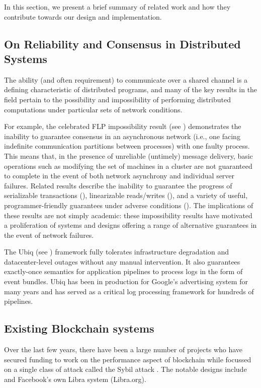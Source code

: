 \label{sec:related}
In this section, we present a brief summary of related work and how they contribute towards
our design and implementation.


\subsection{On Reliability and Consensus in Distributed Systems}

The ability (and often requirement) to communicate over a shared channel is a defining characteristic of distributed
programs, and many of the key results in the field pertain to the possibility and impossibility of performing
distributed computations under particular sets of network conditions.

For example, the celebrated FLP impossibility result (see \cite{fischer1985}) demonstrates the inability to guarantee consensus in an
asynchronous network (i.e., one facing indefinite communication partitions between processes) with one faulty process.
This means that, in the presence of unreliable (untimely) message delivery, basic operations such as modifying the set
of machines in a cluster are
not guaranteed to complete in the event of both network asynchrony and individual server failures. Related results
describe the inability to guarantee the progress of serializable transactions (\cite{Davidson1985}), linearizable
reads/writes (\cite{Gilbert2002}), and a variety of useful, programmer-friendly guarantees under adverse conditions
 (\cite{Bailis2013}). The implications of these results are not simply academic: these impossibility results have motivated
a proliferation of systems and designs offering a range of alternative guarantees in the event of network failures.

The Ubiq (see \cite{ubiq}) framework fully tolerates infrastructure degradation and datacenter-level outages without any manual
intervention. It also guarantees exactly-once semantics for application pipelines to process logs in the form of event
bundles. Ubiq has been in production for Google’s advertising system for many years and has served as a critical log
processing framework for hundreds of pipelines. 

\subsection{Existing Blockchain systems} Over the last few years, there have been a large number of projects who have
secured funding to work on the performance aspect of blockchain while focussed on a single class of attack called the
Sybil attack \cite{john2002}. The notable designs include \cite{rapidchain, chainspace, ava2018, thundertoken} and
Facebook's own Libra system (Libra.org).

